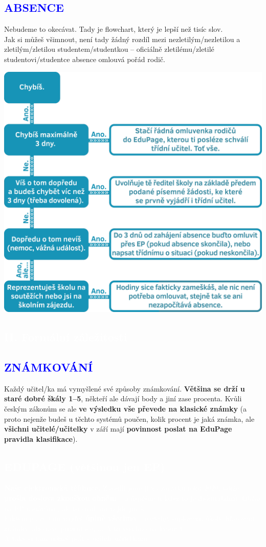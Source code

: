 \documentclass[a5paper, twoside]{article}
\newcommand{\boxik}[2]{
  \begin{tcolorbox}[
    sharp corners,
    colback = #1,
    boxrule = 0pt,
    grow to left by = 25pt,
    grow to right by = 25pt,
    right = 22pt,
    left = 22pt%
  ]
    #2
  \end{tcolorbox}
}
\newcommand{\polonadpis}[4]{
  \vspace*{-50pt}
  \begin{tcolorbox}[colback = #2, boxrule = 0pt, grow to left by = #4,  grow to right by = #4, arc=8pt, height = 30pt]
    \vspace*{5pt}
    \centering \subsection*{\textcolor{#3}{#1}}
  \end{tcolorbox}
}
\newcommand{\podnadpis}[2]{
  \subsection*{\textcolor{#2}{#1}}
}
\begin{document}
\podnadpis{ABSENCE}{blue}
Nebudeme to okecávat. Tady je flowchart, který je lepší než tisíc slov. \\
\noindent Jak si můžeš všimnout, není tady žádný rozdíl mezi nezletilým/nezletilou a zletilým/zletilou studentem/studentkou -- oficiálně zletilému/zletilé studentovi/studentce absence omlouvá pořád rodič.
\begin{center}
	\includegraphics[width=\linewidth]{absence.png}
\end{center}

\vspace{3em}
\pagebreak

\polonadpis{II. Formální záležitosti}{blue}{white}{-3.8cm}

\podnadpis{ZNÁMKOVÁNÍ}{blue}
Každý učitel/ka má vymyšlené své způsoby známkování. \textbf{Většina se drží u staré dobré škály 1--5}, někteří ale dávají body a jiní zase procenta. Kvůli českým zákonům se ale \textbf{ve výsledku vše převede na klasické známky} (a proto nejenže budeš u těchto  systémů poučen, kolik procent je jaká známka, ale \textbf{všichni učitelé/učitelky} v září mají \textbf{povinnost poslat na EduPage pravidla klasifikace}).


\smallskip
\boxik{blue}{\vspace{-10pt}\textcolor{white}{\subsection*{EDUPAGE (většinou jen EP)}
\medskip
  \textbf{Naše elektronická třídnice.} Zavedli jsme ji na začátku roku 2020, takže \textbf{prošla doslova zkouškou ohněm} -- a úspěšně (i když to je diskutabilní). Občas na EP nadáváme, ale to snad ani
  nejde jinak. \\
  Faktem je, že tam najdeš \textbf{úplně všechno} -- rozvrhy, suplování, úkoly, hlasování, známky, absence, prezentace, ... A to všechno na kvadrát. \\
  A taky si tam můžeš psát s učiteli/učitelkami.}}
\end{document}
